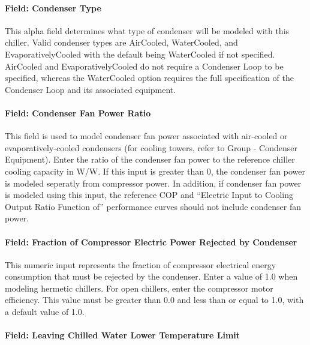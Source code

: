 \paragraph{Field: Condenser Type}\label{field-condenser-type-2-000}

This alpha field determines what type of condenser will be modeled with this chiller. Valid condenser types are AirCooled, WaterCooled, and EvaporativelyCooled with the default being WaterCooled if not specified. AirCooled and EvaporativelyCooled do not require a Condenser Loop to be specified, whereas the WaterCooled option requires the full specification of the Condenser Loop and its associated equipment.

\paragraph{Field: Condenser Fan Power Ratio}\label{field-condenser-fan-power-ratio}

This field is used to model condenser fan power associated with air-cooled or evaporatively-cooled condensers (for cooling towers, refer to Group - Condenser Equipment). Enter the ratio of the condenser fan power to the reference chiller cooling capacity in W/W. If this input is greater than 0, the condenser fan power is modeled seperatly from compressor power. In addition, if condenser fan power is modeled using this input, the reference COP and ``Electric Input to Cooling Output Ratio Function of'' performance curves should not include condenser fan power.

\paragraph{Field: Fraction of Compressor Electric Power Rejected by Condenser}\label{field-fraction-of-compressor-electric-power-rejected-by-condenser}

This numeric input represents the fraction of compressor electrical energy consumption that must be rejected by the condenser. Enter a value of 1.0 when modeling hermetic chillers. For open chillers, enter the compressor motor efficiency. This value must be greater than 0.0 and less than or equal to 1.0, with a default value of 1.0.

\paragraph{Field: Leaving Chilled Water Lower Temperature Limit}\label{field-leaving-chilled-water-lower-temperature-limit-000}

